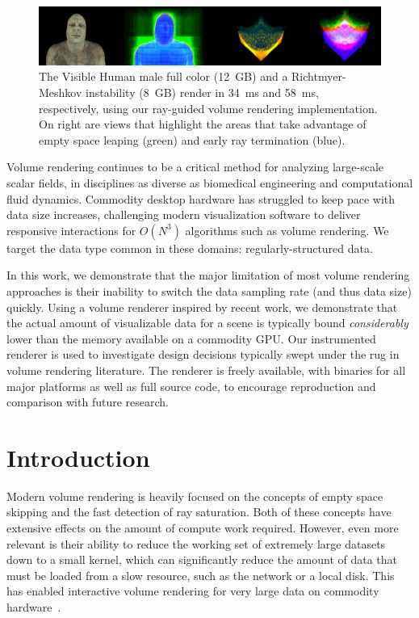 \begin{figure}
  \includegraphics[draft=\isDraft, width=1.00\linewidth]{images/rg/teaser.png}
  \caption{The Visible Human male full color (\tjftilde{}12~GB) and
  a Richtmyer-Meshkov instability (\tjftilde{}8~GB) render in 34~ms
  and 58~ms, respectively, using our ray-guided volume rendering
  implementation.  On right are views that highlight the areas
  that take advantage of empty space leaping (green) and early ray
  termination (blue).}
  \label{figrg:teaser}
\end{figure}

Volume rendering continues to be a critical method for analyzing
large-scale scalar fields, in disciplines as diverse as biomedical
engineering and computational fluid dynamics.
Commodity desktop hardware has struggled to keep pace with data
size increases, challenging modern visualization software to
deliver responsive interactions for $O(N^3)$ algorithms such as
volume rendering.  We target the data type common in these domains:
regularly-structured data.

In this work, we demonstrate that the major limitation of most volume
rendering approaches is their inability to switch the data sampling
rate (and thus data size) quickly.  Using a volume renderer inspired by
recent work, we demonstrate that the actual amount of visualizable data
for a
scene is typically bound \emph{considerably} lower than the memory
available on a commodity GPU.  Our instrumented renderer is used to
investigate design decisions typically swept under the rug in volume
rendering literature.  The renderer is freely available, with binaries
for all major platforms as well as full source code, to encourage
reproduction and comparison with future research.

\section{Introduction}

Modern volume rendering is heavily focused on the concepts of empty
space skipping and the fast detection of ray saturation.  Both of
these concepts have extensive effects on the amount of compute work
required.  However, even more relevant is their ability to reduce the
working set of extremely large datasets down to a small kernel, which
can significantly reduce the amount of data that must be loaded from a
slow resource, such as the network or a local disk.  This has enabled
interactive volume rendering for very large data on commodity
hardware~\cite{Knoll:2010:BVH, Hadwiger:2012:Guided,
Crassin:2009:Gigavoxels}.

